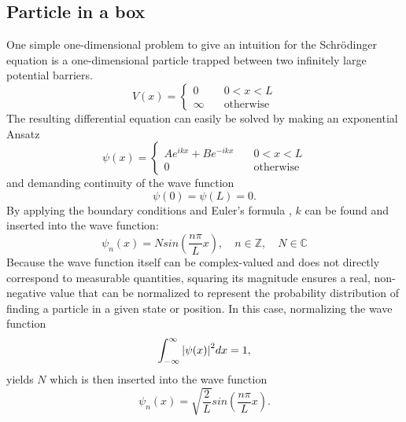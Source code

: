 	\subsection{Particle in a box} \label{sec:particle_in_a_box}
		One simple one-dimensional problem to give an intuition for the Schrödinger equation is a one-dimensional particle trapped between two infinitely large potential barriers.
		\begin{equation}
			\label{eq:box_potential}
			V(x)=
			\left\{
        		\begin{array}{ll}
            		0 & \quad 0 < x < L \\
            		\infty & \quad \text{otherwise}
        		\end{array}
    		\right.
		\end{equation}
		The resulting differential equation can easily be solved by making an exponential Ansatz 
		\begin{equation}
			\label{eq:box_ansatz}
			\psi(x)=\left\{
				\begin{array}{ll}
					Ae^{ikx}+Be^{-ikx} & \quad 0 < x < L \\
					0 & \quad \text{otherwise}
				\end{array}
			\right.
		\end{equation}
		and demanding continuity of the wave function
		\begin{equation}
			\label{eq:box_boundary_condition}
			\psi(0)=\psi(L)=0.
		\end{equation}
		By applying the boundary conditions and Euler's formula \cite{Riley2006-uk}, $k$ can be found and inserted into the wave function:
		\begin{equation}
			\label{eq:box_unnormalized_wavefunction}
			\psi_n(x)=Nsin\left(\frac{n\pi}{L}x\right), \quad n \in \mathbb{Z}, \quad N \in \mathbb{C}
		\end{equation}
		Because the wave function itself can be complex-valued and does not directly correspond to measurable quantities, squaring its magnitude ensures a real, non-negative value that can be normalized to represent the probability distribution of finding a particle in a given state or position.
		In this case, normalizing the wave function
		\begin{equation}
			\label{eq:normalize_condition}
			\int_{-\infty}^{\infty}\abs{\psi(x)}^2dx=1,
		\end{equation}
		yields $N$ which is then inserted into the wave function
		\begin{equation}
			\label{eq:box_normalized_wavefunction}
			\psi_n(x)=\sqrt{\frac{2}{L}}sin\left(\frac{n\pi}{L}x\right).
		\end{equation}
